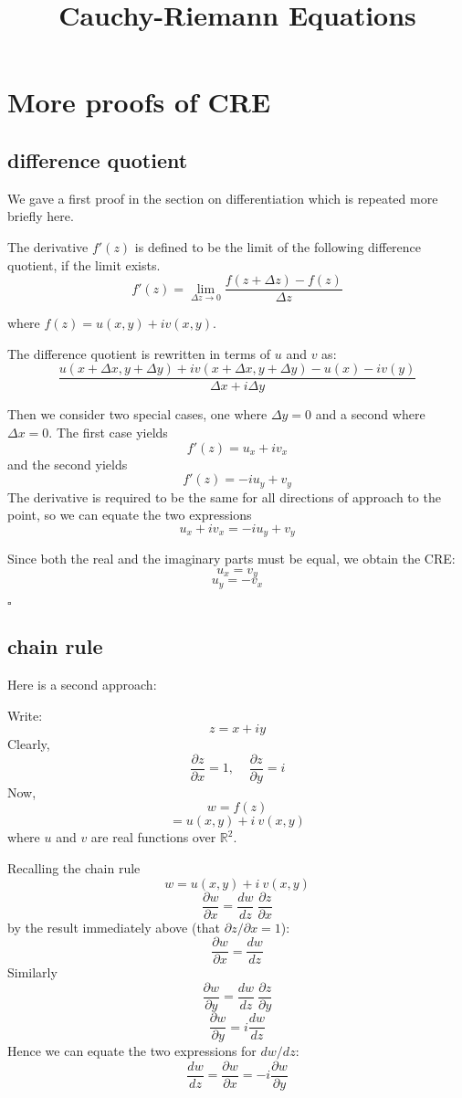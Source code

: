 \documentclass[11pt, oneside]{article}
\title{Cauchy-Riemann Equations}
\date{}
\begin{document}
\maketitle
\Large

\section*{More proofs of CRE}
\subsection*{difference quotient}

We gave a first proof in the section on differentiation which is repeated more briefly here.  

The derivative $f'(z)$ is defined to be the limit of the following difference quotient, if the limit exists.
\[ f'(z) = \lim_{\Delta z \rightarrow 0} \frac{f(z + \Delta z) - f(z)}{\Delta z} \]

where $f(z) = u(x,y) + i v(x,y)$.

The difference quotient is rewritten in terms of $u$ and $v$ as:
\[ \frac{u(x + \Delta x, y + \Delta y) + i v(x + \Delta x, y + \Delta y) - u(x) - i v(y)}{\Delta x + i \Delta y} \]

Then we consider two special cases, one where $\Delta y = 0$ and a second where $\Delta x = 0$.  The first case yields
\[ f'(z) = u_x + i v_x \]
and the second yields
\[ f'(z) = -i u_y + v_y \]
The derivative is required to be the same for all directions of approach to the point, so we can equate the two expressions
\[ u_x + i v_x = -i u_y + v_y \]

Since both the real and the imaginary parts must be equal, we obtain the CRE:
\[ u_x = v_y \]
\[ u_y = - v_x \]

$\square$

\subsection*{chain rule}
Here is a second approach:

Write:
\[ z = x + iy \]
Clearly,
\[ \frac{\partial z}{\partial x} = 1,  \ \ \ \ \  \frac{\partial z}{\partial y} = i \]
Now,
\[ w = f(z) \]
\[ = u(x,y) + i \ v(x,y) \]
where $u$ and $v$ are real functions over $\mathbb{R}^2$.

Recalling the chain rule
\[ w = u(x,y) + i \ v(x,y) \]
\[ \frac{\partial w}{\partial x} = \frac{dw}{dz} \ \frac{\partial z}{\partial x} \]
by the result immediately above (that $\partial z/\partial x = 1$):
\[ \frac{\partial w}{\partial x} =  \frac{dw}{dz} \]
Similarly
\[ \frac{\partial w}{\partial y} = \frac{dw}{dz} \ \frac{\partial z}{\partial y} \]
\[ \frac{\partial w}{\partial y} =  i \frac{dw}{dz} \]
Hence we can equate the two expressions for $dw/dz$:
\[ \frac{dw}{dz} = \frac{\partial w}{\partial x} = -i \frac{\partial w}{\partial y} \]
\end{document}
